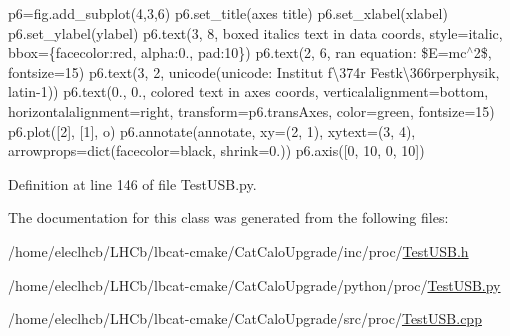 p6=fig.\+add\+\_\+subplot(4,3,6) p6.\+set\+\_\+title(\textquotesingle{}axes title\textquotesingle{}) p6.\+set\+\_\+xlabel(\textquotesingle{}xlabel\textquotesingle{}) p6.\+set\+\_\+ylabel(\textquotesingle{}ylabel\textquotesingle{}) p6.\+text(3, 8, \textquotesingle{}boxed italics text in data coords\textquotesingle{}, style=\textquotesingle{}italic\textquotesingle{}, bbox=\{\textquotesingle{}facecolor\textquotesingle{}\+:\textquotesingle{}red\textquotesingle{}, \textquotesingle{}alpha\textquotesingle{}\+:0., \textquotesingle{}pad\textquotesingle{}\+:10\}) p6.\+text(2, 6, r\textquotesingle{}an equation\+: \$E=mc$^\wedge$2\$\textquotesingle{}, fontsize=15) p6.\+text(3, 2, unicode(\textquotesingle{}unicode\+: Institut f\textbackslash{}374r Festk\textbackslash{}366rperphysik\textquotesingle{}, \textquotesingle{}latin-\/1\textquotesingle{})) p6.\+text(0., 0., \textquotesingle{}colored text in axes coords\textquotesingle{}, verticalalignment=\textquotesingle{}bottom\textquotesingle{}, horizontalalignment=\textquotesingle{}right\textquotesingle{}, transform=p6.\+trans\+Axes, color=\textquotesingle{}green\textquotesingle{}, fontsize=15) p6.\+plot(\mbox{[}2\mbox{]}, \mbox{[}1\mbox{]}, \textquotesingle{}o\textquotesingle{}) p6.\+annotate(\textquotesingle{}annotate\textquotesingle{}, xy=(2, 1), xytext=(3, 4), arrowprops=dict(facecolor=\textquotesingle{}black\textquotesingle{}, shrink=0.)) p6.\+axis(\mbox{[}0, 10, 0, 10\mbox{]}) 



Definition at line 146 of file Test\+U\+S\+B.\+py.



The documentation for this class was generated from the following files\+:\begin{DoxyCompactItemize}
\item 
/home/eleclhcb/\+L\+H\+Cb/lbcat-\/cmake/\+Cat\+Calo\+Upgrade/inc/proc/\hyperlink{TestUSB_8h}{Test\+U\+S\+B.\+h}\item 
/home/eleclhcb/\+L\+H\+Cb/lbcat-\/cmake/\+Cat\+Calo\+Upgrade/python/proc/\hyperlink{TestUSB_8py}{Test\+U\+S\+B.\+py}\item 
/home/eleclhcb/\+L\+H\+Cb/lbcat-\/cmake/\+Cat\+Calo\+Upgrade/src/proc/\hyperlink{TestUSB_8cpp}{Test\+U\+S\+B.\+cpp}\end{DoxyCompactItemize}
